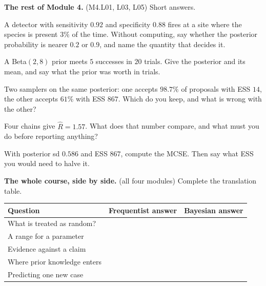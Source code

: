 \documentclass[11pt]{article}
\newcommand{\answerspace}[1]{\vspace{#1}}
\newcommand{\lo}[1]{{\normalfont\small (#1)}}
\begin{document}
\begin{questions}
\item \textbf{The rest of Module 4.} \lo{M4.L01, L03, L05} Short answers.

\begin{parts}
\item A detector with sensitivity $0.92$ and specificity $0.88$ fires at a site where the species is
present $3\%$ of the time. Without computing, say whether the posterior probability is nearer $0.2$
or $0.9$, and name the quantity that decides it.
\answerspace{3.5em}

\item A Beta$(2,8)$ prior meets $5$ successes in $20$ trials. Give the posterior and its mean, and
say what the prior was worth in trials.
\answerspace{3.5em}

\item Two samplers on the same posterior: one accepts $98.7\%$ of proposals with ESS $14$, the other
accepts $61\%$ with ESS $867$. Which do you keep, and what is wrong with the other?
\answerspace{4em}

\item Four chains give $\widehat{R} = 1.57$. What does that number compare, and what must you do
before reporting anything?
\answerspace{3.5em}

\item With posterior sd $0.586$ and ESS $867$, compute the MCSE. Then say what ESS you would need to
halve it.
\answerspace{3.5em}
\end{parts}

\item \textbf{The whole course, side by side.} \lo{all four modules} Complete the translation table.

\begin{center}
\renewcommand{\arraystretch}{1.9}
\begin{tabularx}{\linewidth}{LLL}
\toprule
\textbf{Question} & \textbf{Frequentist answer} & \textbf{Bayesian answer} \\
\midrule
What is treated as random? & & \\
A range for a parameter & & \\
Evidence against a claim & & \\
Where prior knowledge enters & & \\
Predicting one new case & & \\
\bottomrule
\end{tabularx}
\end{center}


\end{questions}
\end{document}
